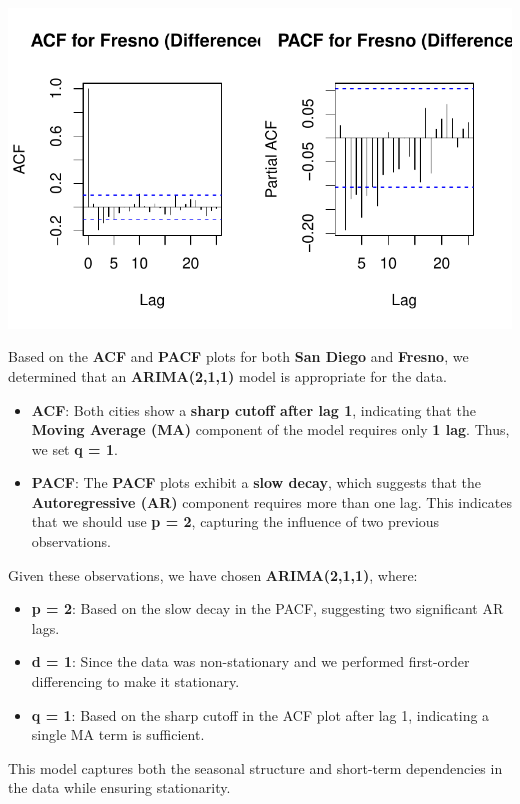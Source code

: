 \documentclass[
  11pt,
]{article}
\begin{document}
\includegraphics{project_files/figure-pdf/unnamed-chunk-87-1.pdf}

Based on the \textbf{ACF} and \textbf{PACF} plots for both \textbf{San
Diego} and \textbf{Fresno}, we determined that an \textbf{ARIMA(2,1,1)}
model is appropriate for the data.

\begin{itemize}
\item
  \textbf{ACF}: Both cities show a \textbf{sharp cutoff after lag 1},
  indicating that the \textbf{Moving Average (MA)} component of the
  model requires only \textbf{1 lag}. Thus, we set \textbf{q = 1}.
\item
  \textbf{PACF}: The \textbf{PACF} plots exhibit a \textbf{slow decay},
  which suggests that the \textbf{Autoregressive (AR)} component
  requires more than one lag. This indicates that we should use
  \textbf{p = 2}, capturing the influence of two previous observations.
\end{itemize}

Given these observations, we have chosen \textbf{ARIMA(2,1,1)}, where:

\begin{itemize}
\item
  \textbf{p = 2}: Based on the slow decay in the PACF, suggesting two
  significant AR lags.
\item
  \textbf{d = 1}: Since the data was non-stationary and we performed
  first-order differencing to make it stationary.
\item
  \textbf{q = 1}: Based on the sharp cutoff in the ACF plot after lag 1,
  indicating a single MA term is sufficient.
\end{itemize}

This model captures both the seasonal structure and short-term
dependencies in the data while ensuring stationarity.
\end{document}
